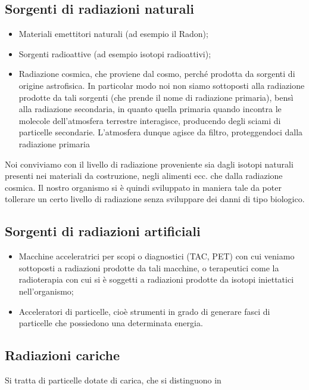 \subsection{Sorgenti di radiazioni naturali}

\begin{itemize}
    \item Materiali emettitori naturali (ad esempio il Radon);
    \item Sorgenti radioattive (ad esempio isotopi radioattivi);
    \item Radiazione cosmica, che proviene dal cosmo, perché prodotta da sorgenti di origine astrofisica. In particolar modo noi non siamo sottoposti alla radiazione prodotte da tali sorgenti (che prende il nome di radiazione primaria), bensì alla radiazione secondaria, in quanto quella primaria quando incontra le molecole dell'atmosfera terrestre interagisce, producendo degli sciami di particelle secondarie. L'atmosfera dunque agisce da filtro, proteggendoci dalla radiazione primaria
\end{itemize}

Noi conviviamo con il livello di radiazione proveniente sia dagli isotopi naturali presenti nei materiali da costruzione, negli alimenti ecc. che dalla radiazione cosmica. Il nostro organismo si è quindi sviluppato in maniera tale da poter tollerare un certo livello di radiazione senza sviluppare dei danni di tipo biologico.

\subsection{Sorgenti di radiazioni artificiali}

\begin{itemize}
    \item Macchine acceleratrici per scopi o diagnostici (TAC, PET) con cui veniamo sottoposti a radiazioni prodotte da tali macchine, o terapeutici come la radioterapia con cui si è soggetti a radiazioni prodotte da isotopi iniettatici nell'organismo;
    \item Acceleratori di particelle, cioè strumenti in grado di generare fasci di particelle che possiedono una determinata energia.
\end{itemize}

\subsection{Radiazioni cariche}
Si tratta di particelle dotate di carica, che si distinguono in

